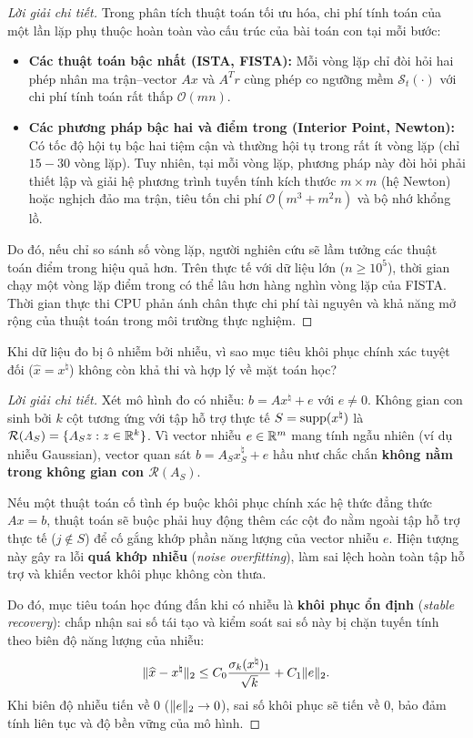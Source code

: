 \begin{proof}[Lời giải chi tiết]
Trong phân tích thuật toán tối ưu hóa, chi phí tính toán của một lần lặp phụ thuộc hoàn toàn vào cấu trúc của bài toán con tại mỗi bước:
\begin{itemize}
    \item \textbf{Các thuật toán bậc nhất (ISTA, FISTA):} Mỗi vòng lặp chỉ đòi hỏi hai phép nhân ma trận--vector $Ax$ và $A^T r$ cùng phép co ngưỡng mềm $\mathcal{S}_t(\cdot)$ với chi phí tính toán rất thấp $\mathcal{O}(mn)$.
    \item \textbf{Các phương pháp bậc hai và điểm trong (Interior Point, Newton):} Có tốc độ hội tụ bậc hai tiệm cận và thường hội tụ trong rất ít vòng lặp (chỉ $15 - 30$ vòng lặp). Tuy nhiên, tại mỗi vòng lặp, phương pháp này đòi hỏi phải thiết lập và giải hệ phương trình tuyến tính kích thước $m \times m$ (hệ Newton) hoặc nghịch đảo ma trận, tiêu tốn chi phí $\mathcal{O}(m^3 + m^2n)$ và bộ nhớ khổng lồ.
\end{itemize}
Do đó, nếu chỉ so sánh số vòng lặp, người nghiên cứu sẽ lầm tưởng các thuật toán điểm trong hiệu quả hơn. Trên thực tế với dữ liệu lớn ($n \ge 10^5$), thời gian chạy một vòng lặp điểm trong có thể lâu hơn hàng nghìn vòng lặp của FISTA. Thời gian thực thi CPU phản ánh chân thực chi phí tài nguyên và khả năng mở rộng của thuật toán trong môi trường thực nghiệm.
\end{proof}

\begin{exercise}
Khi dữ liệu đo bị ô nhiễm bởi nhiễu, vì sao mục tiêu khôi phục chính xác tuyệt đối ($\widehat{x} = x^\natural$) không còn khả thi và hợp lý về mặt toán học?
\end{exercise}

\begin{proof}[Lời giải chi tiết]
Xét mô hình đo có nhiễu: $b = A x^\natural + e$ với $e \ne 0$. 
Không gian con sinh bởi $k$ cột tương ứng với tập hỗ trợ thực tế $S = \operatorname{supp}(x^\natural)$ là $\mathcal{R}(A_S) = \{A_S z : z \in \mathbb{R}^k\}$. Vì vector nhiễu $e \in \mathbb{R}^m$ mang tính ngẫu nhiên (ví dụ nhiễu Gaussian), vector quan sát $b = A_S x^\natural_S + e$ hầu như chắc chắn \textbf{không nằm trong không gian con $\mathcal{R}(A_S)$}.

Nếu một thuật toán cố tình ép buộc khôi phục chính xác hệ thức đẳng thức $Ax = b$, thuật toán sẽ buộc phải huy động thêm các cột đo nằm ngoài tập hỗ trợ thực tế ($j \notin S$) để cố gắng khớp phần năng lượng của vector nhiễu $e$. Hiện tượng này gây ra lỗi \textbf{quá khớp nhiễu} (\emph{noise overfitting}), làm sai lệch hoàn toàn tập hỗ trợ và khiến vector khôi phục không còn thưa.

Do đó, mục tiêu toán học đúng đắn khi có nhiễu là \textbf{khôi phục ổn định} (\emph{stable recovery}): chấp nhận sai số tái tạo và kiểm soát sai số này bị chặn tuyến tính theo biên độ năng lượng của nhiễu:
\[
\|\widehat{x} - x^\natural\|_2 \le C_0 \frac{\sigma_k(x^\natural)_1}{\sqrt{k}} + C_1 \|e\|_2.
\]
Khi biên độ nhiễu tiến về 0 ($\|e\|_2 \to 0$), sai số khôi phục sẽ tiến về 0, bảo đảm tính liên tục và độ bền vững của mô hình.
\end{proof}
